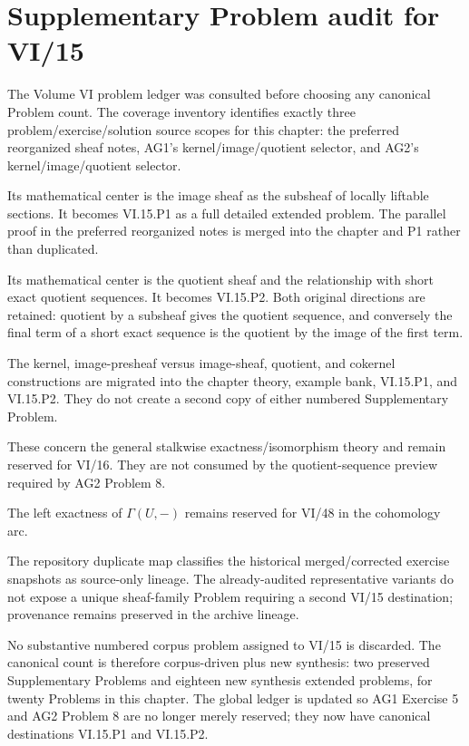 \section*{Supplementary Problem audit for VI/15}

The Volume VI problem ledger was consulted before choosing any canonical Problem count.  The
coverage inventory identifies exactly three problem/exercise/solution source scopes for this
chapter: the preferred reorganized sheaf notes, AG1's kernel/image/quotient selector, and
AG2's kernel/image/quotient selector.

\begin{description}[style=nextline]
\item[AG1 Exercise 5 --- INCLUDE/MERGE.]
Its mathematical center is the image sheaf as the subsheaf of locally liftable sections.
It becomes VI.15.P1 as a full detailed extended problem.  The parallel proof in the preferred
reorganized notes is merged into the chapter and P1 rather than duplicated.

\item[AG2 Problem 8 --- INCLUDE.]
Its mathematical center is the quotient sheaf and the relationship with short exact
quotient sequences.  It becomes VI.15.P2.  Both original directions are retained: quotient
by a subsheaf gives the quotient sequence, and conversely the final term of a short exact
sequence is the quotient by the image of the first term.

\item[Preferred sheaf notes T04 --- MERGE.]
The kernel, image-presheaf versus image-sheaf, quotient, and cokernel constructions are
migrated into the chapter theory, example bank, VI.15.P1, and VI.15.P2.  They do not create
a second copy of either numbered Supplementary Problem.

\item[AG1 Exercise 6 and AG2 Problem 7 --- MOVE.]
These concern the general stalkwise exactness/isomorphism theory and remain reserved for
VI/16.  They are not consumed by the quotient-sequence preview required by AG2 Problem 8.

\item[AG2 Problem 9 --- MOVE.]
The left exactness of $\Gamma(U,-)$ remains reserved for VI/48 in the cohomology arc.

\item[Merged-exercise archive lineage --- ARCHIVE-SOURCE-ONLY.]
The repository duplicate map classifies the historical merged/corrected exercise snapshots
as source-only lineage.  The already-audited representative variants do not expose a unique
sheaf-family Problem requiring a second VI/15 destination; provenance remains preserved in
the archive lineage.
\end{description}

No substantive numbered corpus problem assigned to VI/15 is discarded.  The canonical
count is therefore corpus-driven plus new synthesis: two preserved Supplementary Problems and
eighteen new synthesis extended problems, for twenty Problems in this chapter.  The global ledger is
updated so AG1 Exercise 5 and AG2 Problem 8 are no longer merely reserved; they now have
canonical destinations VI.15.P1 and VI.15.P2.
